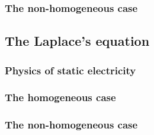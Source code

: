 \subsubsection{The non-homogeneous case}


\subsection{The Laplace's equation}

\subsubsection{Physics of static electricity}

\subsubsection{The homogeneous case}

\subsubsection{The non-homogeneous case}